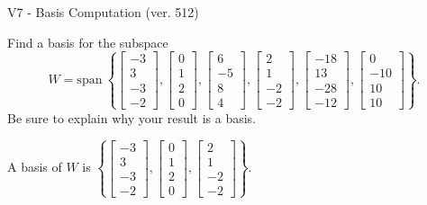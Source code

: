 \begin{exercise}
  \begin{exerciseTitle}V7 - Basis Computation (ver. 512)\end{exerciseTitle}
  \begin{exerciseStatement}
    Find a basis for the subspace 
\[W=\mathrm{span}\ \left\{\left[\begin{array}{r}
-3 \\
3 \\
-3 \\
-2
\end{array}\right] , \left[\begin{array}{r}
0 \\
1 \\
2 \\
0
\end{array}\right] , \left[\begin{array}{r}
6 \\
-5 \\
8 \\
4
\end{array}\right] , \left[\begin{array}{r}
2 \\
1 \\
-2 \\
-2
\end{array}\right] , \left[\begin{array}{r}
-18 \\
13 \\
-28 \\
-12
\end{array}\right] , \left[\begin{array}{r}
0 \\
-10 \\
10 \\
10
\end{array}\right]\right\}.\]
 Be sure to explain why your result is a basis.


  \end{exerciseStatement}
  \begin{exerciseAnswer}
   A basis of \(W\) is  \(\left\{\left[\begin{array}{r}
-3 \\
3 \\
-3 \\
-2
\end{array}\right] , \left[\begin{array}{r}
0 \\
1 \\
2 \\
0
\end{array}\right] , \left[\begin{array}{r}
2 \\
1 \\
-2 \\
-2
\end{array}\right]\right\}\).
  


  \end{exerciseAnswer}
\end{exercise}